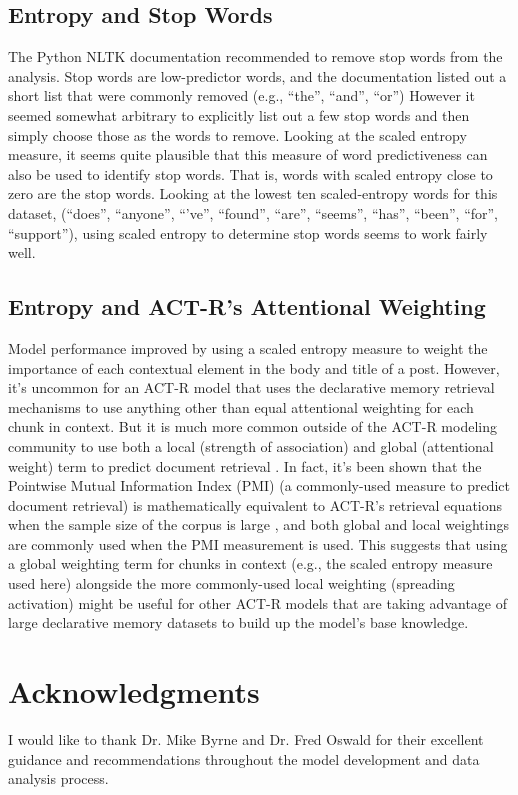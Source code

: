 \documentclass[10pt,letterpaper]{article}
\begin{document}
\subsection{Entropy and Stop Words}

The Python NLTK documentation \cite{Bird2009} recommended to remove stop words from the analysis.
Stop words are low-predictor words, and the documentation listed out a short list that were commonly removed (e.g., ``the'', ``and'', ``or'')
However it seemed somewhat arbitrary to explicitly list out a few stop words and then simply choose those as the words to remove.
Looking at the scaled entropy measure, it seems quite plausible that this measure of word predictiveness can also be used to identify stop words.
That is, words with scaled entropy close to zero are the stop words.
Looking at the lowest ten scaled-entropy words for this dataset, (``does'', ``anyone'', ``'ve'', ``found'', ``are'', ``seems'', ``has'', ``been'', ``for'', ``support''),
using scaled entropy to determine stop words seems to work fairly well.

\subsection{Entropy and ACT-R's Attentional Weighting}

Model performance improved by using a scaled entropy measure to weight the importance of each contextual element in the body and title of a post.
However, it's uncommon for an ACT-R model that uses the declarative memory retrieval mechanisms to use anything other than equal attentional weighting for each chunk in context.
But it is much more common outside of the ACT-R modeling community to use both a local (strength of association) and global (attentional weight) term to predict document retrieval .
In fact, it's been shown that the Pointwise Mutual Information Index (PMI) (a commonly-used measure to predict document retrieval)
is mathematically equivalent to ACT-R's retrieval equations when the sample size of the corpus is large \cite{Budiu2007, Farahat2004},
and both global and local weightings are commonly used when the PMI measurement is used.
This suggests that using a global weighting term for chunks in context (e.g., the scaled entropy measure used here) alongside the more commonly-used local weighting (spreading activation) might be useful for other ACT-R models that are taking advantage of large declarative memory datasets to build up the model's base knowledge.

\section{Acknowledgments}

I would like to thank Dr. Mike Byrne and Dr. Fred Oswald for their excellent guidance and recommendations throughout the model development and data analysis process.


\setlength{\bibleftmargin}{.125in}
\setlength{\bibindent}{-\bibleftmargin}

\end{document}

